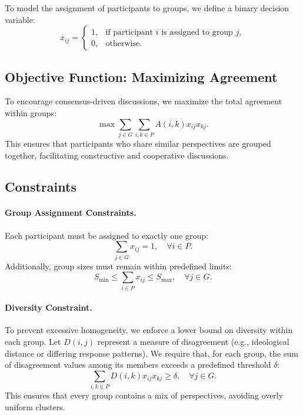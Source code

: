 \documentclass[11pt,a4paper]{article}
\begin{document}
To model the assignment of participants to groups, we define a binary decision variable:
\begin{equation}
    x_{ij} =
    \begin{cases} 
        1, & \text{if participant } i \text{ is assigned to group } j, \\
        0, & \text{otherwise}.
    \end{cases}
\end{equation}

\subsection{Objective Function: Maximizing Agreement}

To encourage consensus-driven discussions, we maximize the total agreement within groups:
\begin{equation}
\max \sum_{j \in G} \sum_{i,k \in P} A(i,k) x_{ij} x_{kj}.
\end{equation}
This ensures that participants who share similar perspectives are grouped together, facilitating constructive and cooperative discussions.

\subsection{Constraints}

\paragraph{Group Assignment Constraints.} Each participant must be assigned to exactly one group:
\begin{equation}
    \sum_{j \in G} x_{ij} = 1, \quad \forall i \in P.
\end{equation}
Additionally, group sizes must remain within predefined limits:
\begin{equation}
    S_{\min} \leq \sum_{i \in P} x_{ij} \leq S_{\max}, \quad \forall j \in G.
\end{equation}

\paragraph{Diversity Constraint.} To prevent excessive homogeneity, we enforce a lower bound on diversity within each group. Let \( D(i, j) \) represent a measure of disagreement (e.g., ideological distance or differing response patterns). We require that, for each group, the sum of disagreement values among its members exceeds a predefined threshold \( \delta \):
\begin{equation}
    \sum_{i,k \in P} D(i,k) x_{ij} x_{kj} \geq \delta, \quad \forall j \in G.
\end{equation}
This ensures that every group contains a mix of perspectives, avoiding overly uniform clusters.
\end{document}
